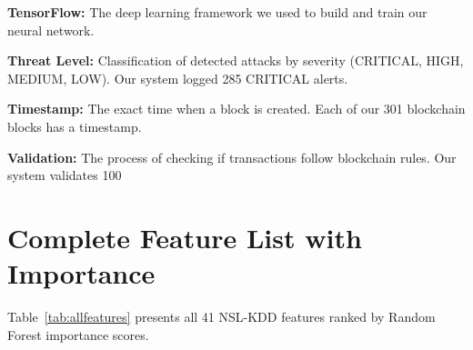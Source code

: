 \documentclass[12pt,a4paper]{report}
\begin{document}
\textbf{TensorFlow:} The deep learning framework we used to build and train our neural network.

\textbf{Threat Level:} Classification of detected attacks by severity (CRITICAL, HIGH, MEDIUM, LOW). Our system logged 285 CRITICAL alerts.

\textbf{Timestamp:} The exact time when a block is created. Each of our 301 blockchain blocks has a timestamp.

\textbf{Validation:} The process of checking if transactions follow blockchain rules. Our system validates 100%

\appendix

\chapter{Complete Feature List with Importance}

Table~\ref{tab:allfeatures} presents all 41 NSL-KDD features ranked by Random Forest importance scores.
\end{document}
